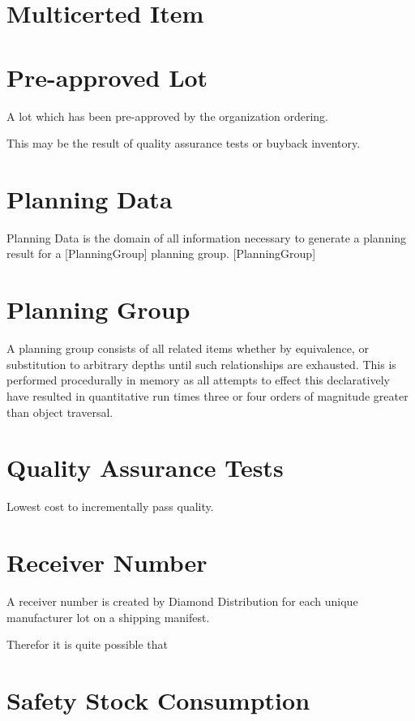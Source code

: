 \documentclass[letterpaper,10pt,english]{sphinxmanual}
\begin{document}
\section{Multicerted Item}
\label{APS/Glossary:multicerted-item}

\section{Pre-approved Lot}
\label{APS/Glossary:pre-approved-lot}
A lot which has been pre-approved by the organization ordering.

This may be the result of quality assurance tests or buyback inventory.


\section{Planning Data}
\label{APS/Glossary:planning-data}
Planning Data is the domain of all information necessary to generate a
planning result for a {[}PlanningGroup{]} planning group. {[}PlanningGroup{]}


\section{Planning Group}
\label{APS/Glossary:planning-group}
A planning group consists of all related items whether by equivalence,
or substitution to arbitrary depths until such relationships are
exhausted. This is performed procedurally in memory as all attempts to
effect this declaratively have resulted in quantitative run times three
or four orders of magnitude greater than object traversal.


\section{Quality Assurance Tests}
\label{APS/Glossary:quality-assurance-tests}
Lowest cost to incrementally pass quality.


\section{Receiver Number}
\label{APS/Glossary:receiver-number}
A receiver number is created by Diamond Distribution for each unique
manufacturer lot on a shipping manifest.

Therefor it is quite possible that


\section{Safety Stock Consumption}
\label{APS/Glossary:safety-stock-consumption}
\end{document}
